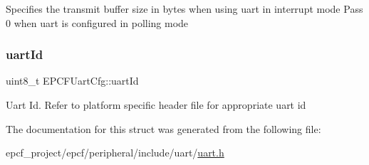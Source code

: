 Specifies the transmit buffer size in bytes when using uart in interrupt mode Pass 0 when uart is configured in polling mode \mbox{\label{structEPCFUartCfg_a7fcc9c804313cbc8f01af381ea28a840}} 
\subsubsection{\texorpdfstring{uart\+Id}{uartId}}
{\footnotesize\ttfamily uint8\+\_\+t E\+P\+C\+F\+Uart\+Cfg\+::uart\+Id}

Uart Id. Refer to platform specific header file for appropriate uart id 

The documentation for this struct was generated from the following file\+:\begin{DoxyCompactItemize}
\item 
epcf\+\_\+project/epcf/peripheral/include/uart/\mbox{\hyperlink{uart_8h}{uart.\+h}}\end{DoxyCompactItemize}
